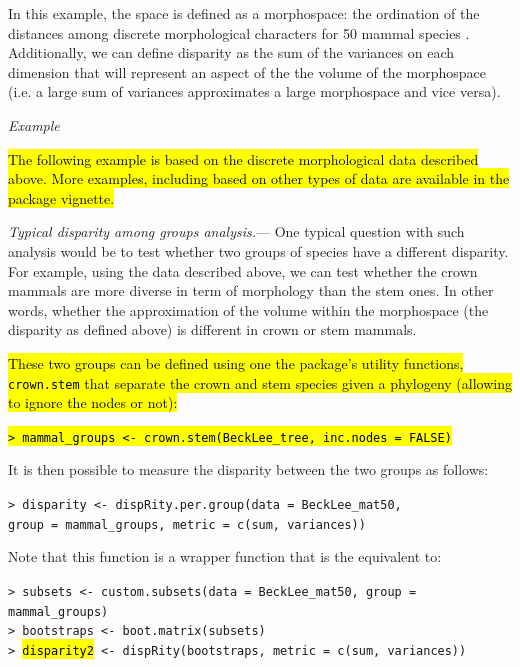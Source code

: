 \documentclass[12pt,letterpaper]{article}
\renewcommand{\subsection}[1]{%
\bigskip
\begin{center}
\begin{large}
\normalfont\itshape #1
\end{large}
\end{center}}
\renewcommand{\subsubsection}[1]{%
\vspace{2ex}
\noindent
\textit{#1.}---}
\begin{document}
In this example, the space is defined as a morphospace: the ordination of the distances among discrete morphological characters for 50 mammal species \citep[from][]{beckancient2014}.
Additionally, we can define disparity as the sum of the variances on each dimension \citep{foote1991morphological,Wills1994} that will represent an aspect of the the volume of the morphospace (i.e. a large sum of variances approximates a large morphospace and vice versa).

\subsection{Example}

\hl{The following example is based on the discrete morphological data described above. More examples, including based on other types of data are available in the package vignette.}

\subsubsection{Typical disparity among groups analysis}
One typical question with such analysis would be to test whether two groups of species have a different disparity.
For example, using the data described above, we can test whether the crown mammals are more diverse in term of morphology than the stem ones.
In other words, whether the approximation of the volume within the morphospace (the disparity as defined above) is different in crown or stem mammals.

\hl{\noindent These two groups can be defined using one the package's utility functions, \texttt{crown.stem} that separate the crown and stem species given a phylogeny (allowing to ignore the nodes or not):}

\noindent
\hl{\texttt{> mammal\_groups <- crown.stem(BeckLee\_tree, inc.nodes = FALSE)}}

\noindent It is then possible to measure the disparity between the two groups as follows:

\noindent
\texttt{> disparity <- dispRity.per.group(data = BeckLee\_mat50,}\\
\texttt{group = mammal\_groups, metric = c(sum, variances))}

\noindent Note that this function is a wrapper function that is the equivalent to:

\noindent
\texttt{> subsets <- custom.subsets(data = BeckLee\_mat50, group = mammal\_groups)}\\
\noindent
\texttt{> bootstraps <- boot.matrix(subsets)}\\
\noindent
\texttt{> \hl{disparity2} <- dispRity(bootstraps, metric = c(sum, variances))}\\
\end{document}
